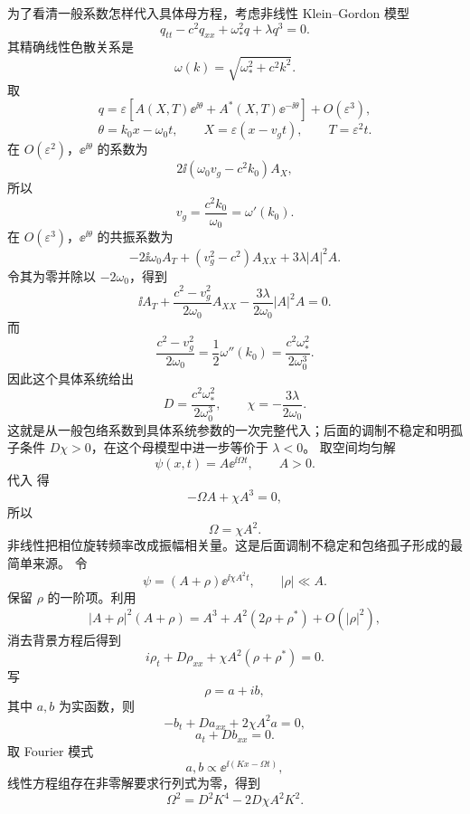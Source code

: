 为了看清一般系数怎样代入具体母方程，考虑非线性 Klein--Gordon 模型
\begin{equation*}q_{tt}-c^2q_{xx}+\omega_*^2q+\lambda q^3=0.\end{equation*}
其精确线性色散关系是
\[
\omega(k)=\sqrt{\omega_*^2+c^2k^2}.
\]
取
\[
q=\varepsilon\left[A(X,T)\ee^{\ii\theta}+A^*(X,T)\ee^{-\ii\theta}\right]+O(\varepsilon^3),
\]
\[
\theta=k_0x-\omega_0t,
\qquad
X=\varepsilon(x-v_gt),
\qquad
T=\varepsilon^2t.
\]
在 $O(\varepsilon^2)$，$\ee^{\ii\theta}$ 的系数为
\[
2\ii(\omega_0v_g-c^2k_0)A_X,
\]
所以
\[
v_g=\frac{c^2k_0}{\omega_0}=\omega'(k_0).
\]
在 $O(\varepsilon^3)$，$\ee^{\ii\theta}$ 的共振系数为
\[
-2\ii\omega_0A_T+(v_g^2-c^2)A_{XX}+3\lambda|A|^2A.
\]
令其为零并除以 $-2\omega_0$，得到
\[
\ii A_T+\frac{c^2-v_g^2}{2\omega_0}A_{XX}
-\frac{3\lambda}{2\omega_0}|A|^2A=0.
\]
而
\[
\frac{c^2-v_g^2}{2\omega_0}
=\frac12\omega''(k_0)
=\frac{c^2\omega_*^2}{2\omega_0^3}.
\]
因此这个具体系统给出
\begin{equation*}{
D=\frac{c^2\omega_*^2}{2\omega_0^3},
\qquad
\chi=-\frac{3\lambda}{2\omega_0}
}.\end{equation*}
这就是从一般包络系数到具体系统参数的一次完整代入；后面的调制不稳定和明孤子条件 $D\chi>0$，在这个母模型中进一步等价于 $\lambda<0$。
取空间均匀解
\[
\psi(x,t)=A \ee^{\ii \Omega t},
\qquad A>0.
\]
代入  得
\[
-\Omega A+\chi A^3=0,
\]
所以
\[
{\Omega=\chi A^2}.
\]
非线性把相位旋转频率改成振幅相关量。这是后面调制不稳定和包络孤子形成的最简单来源。
令
\[
\psi=(A+\rho)\ee^{\ii \chi A^2t},
\qquad |\rho|\ll A.
\]
保留 $\rho$ 的一阶项。利用
\[
|A+\rho|^2(A+\rho)
=A^3+A^2(2\rho+\rho^*)+O(|\rho|^2),
\]
消去背景方程后得到
\[
i\rho_t+D\rho_{xx}
+\chi A^2(\rho+\rho^*)=0.
\]
写
\[
\rho=a+ib,
\]
其中 $a,b$ 为实函数，则
\[
-b_t+D a_{xx}+2\chi A^2a=0,
\]
\[
a_t+D b_{xx}=0.
\]
取 Fourier 模式
\[
a,b\propto \ee^{\ii (Kx-\Omega t)},
\]
线性方程组存在非零解要求行列式为零，得到
\begin{equation*}{
\Omega^2
=D^2K^4-2D\chi A^2K^2
}.\end{equation*}

